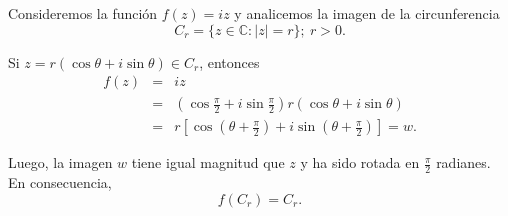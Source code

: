 \begin{ejemplo}
Consideremos la función $f(z) = iz$ y analicemos la imagen de la circunferencia
$$C_r = \{z \in \mathbb{C} : |z| = r \}; ~ r > 0.$$

Si $z = r (\cos \theta + i \sin \theta) \in C_r$, entonces
\begin{eqnarray*}
f(z) &=& iz \\
&=& \left( \cos \frac{\pi}{2} + i \sin \frac{\pi}{2} \right) r (\cos \theta + i \sin \theta) \\
&=& r \left[ \cos\left( \theta + \frac{\pi}{2} \right) + i \sin \left( \theta + \frac{\pi}{2}  \right) \right] = w.
\end{eqnarray*}

Luego, la imagen $w$ tiene igual magnitud que $z$ y ha sido rotada en $\frac{\pi}{2}$ radianes. En consecuencia,
$$f(C_r) = C_r.$$
\end{ejemplo}

